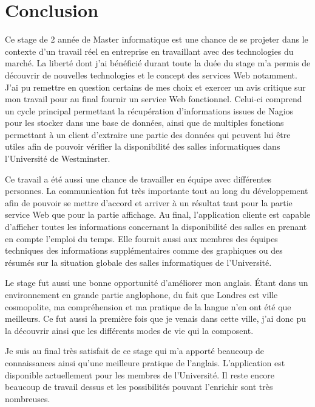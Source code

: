 \chapter{Conclusion}

Ce stage de 2 ann\'ee de Master informatique est une chance de se projeter dans le contexte d'un travail r\'eel en entreprise en travaillant avec des technologies du march\'e.
La libert\'e dont j'ai b\'en\'efici\'e durant toute la du\'ee du stage m'a permis de d\'ecouvrir de nouvelles technologies et le concept des services Web notamment.
J'ai pu remettre en question certains de mes choix et exercer un avis critique sur mon travail pour au final fournir un service Web fonctionnel.
Celui-ci comprend un cycle principal permettant la r\'ecup\'eration d'informations issues de Nagios pour les stocker dans une base de donn\'ees, ainsi que de multiples fonctions permettant \`a un client d'extraire une partie des donn\'ees qui peuvent lui \^etre utiles afin de pouvoir v\'erifier la disponibilit\'e des salles informatiques dans l'Universit\'e de Westminster.

Ce travail a \'et\'e aussi une chance de travailler en \'equipe avec diff\'erentes personnes.
La communication fut tr\`es importante tout au long du d\'eveloppement afin de pouvoir se mettre d'accord et arriver \`a un r\'esultat tant pour la partie service Web que pour la partie affichage.
Au final, l'application cliente est capable d'afficher toutes les informations concernant la disponibilit\'e des salles en prenant en compte l'emploi du temps.
Elle fournit aussi aux membres des \'equipes techniques des informations suppl\'ementaires comme des graphiques ou des r\'esum\'es sur la situation globale des salles informatiques de l'Universit\'e.

Le stage fut aussi une bonne opportunit\'e d'am\'eliorer mon anglais.
\'Etant dans un environnement en grande partie anglophone, du fait que Londres est ville cosmopolite, ma compr\'ehension et ma pratique de la langue n'en ont \'et\'e que meilleurs.
Ce fut aussi la premi\`ere fois que je venais dans cette ville, j'ai donc pu la d\'ecouvrir ainsi que les diff\'erents modes de vie qui la composent.

Je suis au final tr\`es satisfait de ce stage qui m'a apport\'e beaucoup de connaissances ainsi qu'une meilleure pratique de l'anglais.
L'application est disponible actuellement pour les membres de l'Universit\'e.
Il reste encore beaucoup de travail dessus et les possibilit\'es pouvant l'enrichir sont tr\`es nombreuses.

\clearpage
